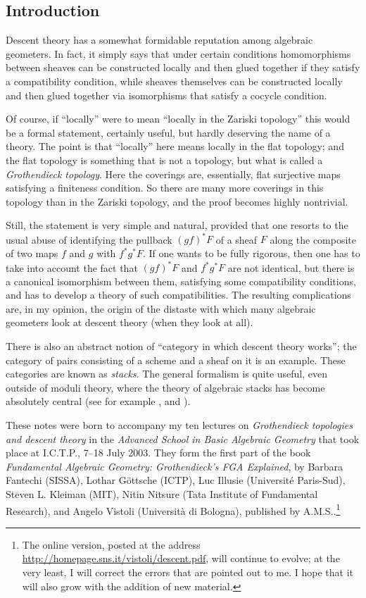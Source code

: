 \begin{0   INTRODUCTION}
\chapter*{Introduction}
Descent theory has a somewhat formidable reputation among algebraic geometers. In fact, it simply says that under certain conditions homomorphisms between \qc sheaves can be constructed locally and then glued together if they satisfy a compatibility condition, while \qc sheaves themselves can be constructed locally and then glued together via isomorphisms that satisfy a cocycle condition.

Of course, if ``locally'' were to mean ``locally in the Zariski topology'' this would be a formal statement, certainly useful, but hardly deserving the name of a theory. The point is that ``locally'' here means locally in the flat topology; and the flat topology is something that is not a topology, but what is called a \emph{Grothendieck topology}. Here the coverings are, essentially, flat surjective maps satisfying a finiteness condition. So there are many more coverings in this topology than in the Zariski topology, and the proof becomes highly nontrivial.

Still, the statement is very simple and natural, provided that one resorts to the usual abuse of identifying the pullback $(gf)^{*}F$ of a sheaf $F$ along the composite of two maps $f$ and $g$ with $f^{*}g^{*}F$. If one wants to be fully rigorous, then one has to take into account the fact that $(gf)^{*}F$ and $f^{*}g^{*}F$ are not identical, but there is a canonical isomorphism between them, satisfying some compatibility conditions, and has to develop a theory of such compatibilities. The resulting complications are, in my opinion, the origin of the distaste with which many algebraic geometers look at descent theory (when they look at all).

There is also an abstract notion of ``category in which descent theory works''; the category of pairs consisting of a scheme and a \qc sheaf on it is an example. These categories are known as \emph{stacks}. The general formalism is quite useful, even outside of moduli theory, where the theory of algebraic stacks has become absolutely central (see for example \cite{deligne-mumford}, \cite{artin74} and \cite{laumon-moretbailly}).

These notes were born to accompany my ten lectures on \emph{Grothendieck topologies and descent theory} in the \emph{Advanced School in Basic Algebraic Geometry} that took place at I.C.T.P., 7--18 July 2003. They form the first part of the book \emph{Fundamental Algebraic Geometry: Grothendieck's FGA Explained}, by Barbara Fantechi (SISSA), Lothar G\"ottsche (ICTP), Luc Illusie (Universit\'e Paris-Sud), Steven L. Kleiman (MIT), Nitin Nitsure (Tata Institute of Fundamental Research), and Angelo Vistoli (Universit\`a di Bologna), published by A.M.S..\footnote{The online version, posted at the address \url{http://homepage.sns.it/vistoli/descent.pdf}, will continue to evolve; at the very least, I will correct the errors that are pointed out to me. I hope that it will also grow with the addition of new material.}


\end{0   INTRODUCTION}

